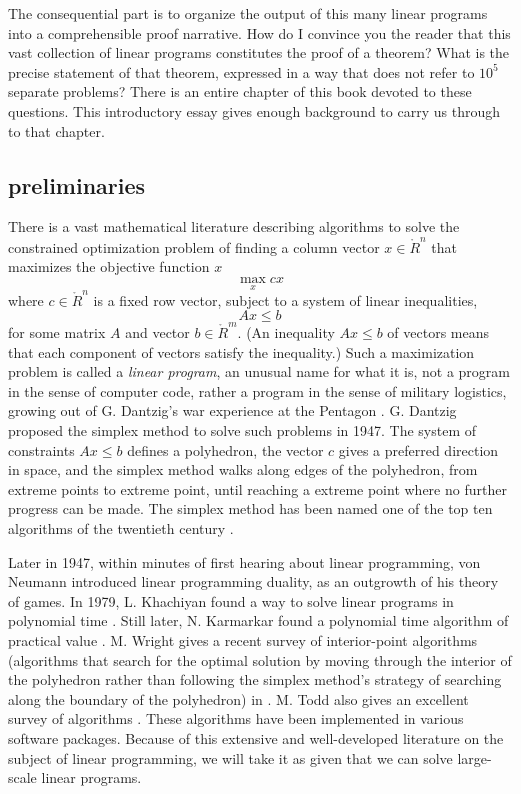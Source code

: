 The consequential part is to organize the output of this many linear
programs into a comprehensible proof narrative.  How do I convince you
the reader that this vast collection of linear programs constitutes
the proof of a theorem?  What is the precise statement of that
theorem, expressed in a way that does not refer to $10^5$ separate
problems? There is an entire chapter of this book devoted to these
questions.  This introductory essay gives enough background to carry
us through to that chapter.


\subsection{preliminaries}

There is a vast mathematical literature describing algorithms to
solve the constrained optimization problem of finding a column vector
$x\in\ring{R}^n$ that maximizes the objective function $ x$
\begin{equation}\label{eqn:lp1}
\max_{x}  c x
\end{equation}
where $c\in\ring{R}^n$ is a fixed row vector, subject to a system of
linear inequalities,
\begin{equation}\label{eqn:lp2}
A x\le b
\end{equation} 
for some matrix $A$ and vector $b\in \ring{R}^m$.  (An inequality $A
x\le b$ of vectors means that each component of vectors satisfy the
inequality.)  Such a maximization problem is called a {\it linear
  program}, an unusual name for what it is, not a program in the sense
of computer code, rather a program in the sense of military logistics,
growing out of G. Dantzig's war experience at the Pentagon
\cite{Dan91}.  G. Dantzig proposed the simplex method to solve such
problems in 1947.  The system of constraints $A x \le b$ defines a
polyhedron, the vector $c$ gives a preferred direction in space, and
the simplex method walks along edges of the polyhedron, from extreme points to
extreme point, until reaching a extreme point where no further progress can be made.
The simplex method has been named one of the top ten algorithms of the
twentieth century \cite{Cip00}.

Later in 1947, within minutes of first hearing about
linear programming, von Neumann introduced linear programming
duality, as an outgrowth of his theory of games.
In 1979, L. Khachiyan found a way to solve linear programs in
polynomial time \cite{Kha79}.  Still later, 
N. Karmarkar found a polynomial
time algorithm of practical value \cite{Kar84}.  
M. Wright gives a recent survey
of interior-point algorithms (algorithms that search for the 
optimal solution by moving through the interior of the polyhedron
rather than following the simplex method's strategy of searching
along the boundary of the polyhedron) in \cite{Wri05}. 
M. Todd also gives an excellent survey of algorithms \cite{Tod02}.
These algorithms have been implemented in various
software packages.
Because of this extensive and well-developed literature on the
subject of linear programming, we will take it as given that we
can solve large-scale linear programs.


